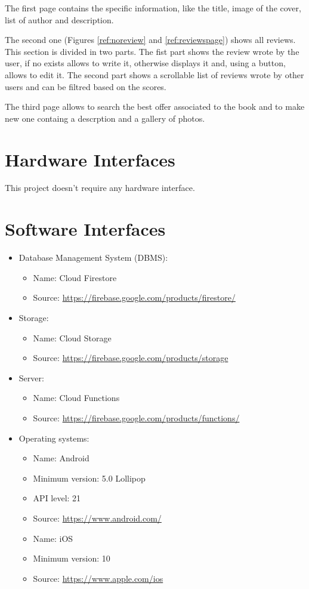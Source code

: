 The first page contains the specific information, like the title, image of the cover, list of author and description.

The second one (Figures \ref{ref:noreview} and \ref{ref:reviewspage}) shows all reviews. This section is divided in two parts.
The fist part shows the review wrote by the user, if no exists allows to write it, otherwise displays it and, using a button, allows to edit it.
The second part shows a scrollable list of reviews wrote by other users and can be filtred based on the scores.

The third page allows to search the best offer associated to the book and to make new one containg a descrption and a gallery of photos.
\clearpage
\section{Hardware Interfaces}
This project doesn’t require any hardware interface.
\section{Software Interfaces}
\begin{itemize}
    \item Database Management System (DBMS):
    \begin{itemize}
        \item 
        Name: Cloud Firestore
        \item 
        Source: \url{https://firebase.google.com/products/firestore/}
    \end{itemize}
    \item Storage:
    \begin{itemize}
        \item 
        Name: Cloud Storage
        \item 
        Source: \url{https://firebase.google.com/products/storage}
    \end{itemize}
    \item Server:
    \begin{itemize}
        \item 
        Name: Cloud Functions
        \item 
        Source: \url{https://firebase.google.com/products/functions/}
    \end{itemize}
    \item
    Operating systems:
    \begin{itemize}
        \item 
        Name: Android
        \item 
        Minimum version: 5.0 Lollipop 
        \item 
        API level: 21
        \item 
        Source: \url{https://www.android.com/}
        \newline
        \item 
        Name: iOS
        \item 
        Minimum version: 10
        \item 
        Source: \url{https://www.apple.com/ios}
    \end{itemize}
\end{itemize}
